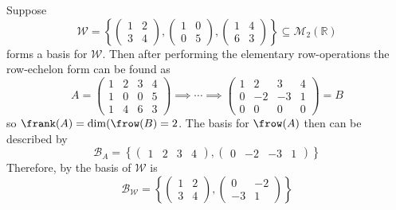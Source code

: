 \begin{exm}
	Suppose
	\begin{equation*}
		\mathcal{W}=\left\{\begin{pmatrix}
			1 & 2 \\
			3 & 4
		\end{pmatrix},
		\begin{pmatrix}
			1 & 0 \\
			0 & 5
		\end{pmatrix},
		\begin{pmatrix}
			1 & 4 \\
			6 & 3
		\end{pmatrix}
		\right\}\subseteq\mathcal{M}_2(\mathbb{R})
	\end{equation*}
	forms a basis for $\mathcal{W}$. Then after performing the elementary row-operations
	the row-echelon form can be found as
	\begin{equation*}
		A=\begin{pmatrix}
			1 & 2 & 3 & 4 \\
			1 & 0 & 0 & 5 \\
			1 & 4 & 6 & 3
		\end{pmatrix} \implies \cdots \implies
		\begin{pmatrix}
			1 & 2  & 3  & 4 \\
			0 & -2 & -3 & 1 \\
			0 & 0  & 0  & 0
		\end{pmatrix}=B
	\end{equation*}
	so $\frank(A)=\dim(\frow(B)=2$. The basis for $\frow(A)$ then can be described by
	\begin{equation*}
		\mathcal{B}_A=\left\{
		\begin{pmatrix}
			1 & 2 & 3 & 4
		\end{pmatrix},
		\begin{pmatrix}
			0 & -2 & -3 & 1
		\end{pmatrix}
		\right\}
	\end{equation*}
	Therefore, by  the
	basis of $\mathcal{W}$ is
	\begin{equation*}
		\mathcal{B}_\mathcal{W}=\left\{
		\begin{pmatrix}
			1 & 2 \\
			3 & 4
		\end{pmatrix},
		\begin{pmatrix}
			0  & -2 \\
			-3 & 1
		\end{pmatrix}
		\right\}
	\end{equation*}
\end{exm}

